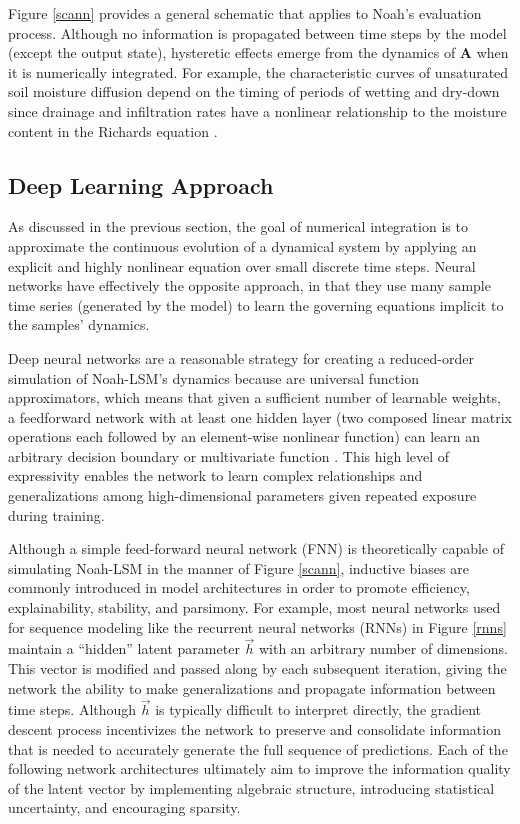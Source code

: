 \documentclass[11pt]{article}
\begin{document}
\begin{multicols}{2}

    Figure \ref{scann} provides a general schematic that applies to Noah's evaluation process. Although no information is propagated between time steps by the model (except the output state), hysteretic effects emerge from the dynamics of \textbf{A} when it is numerically integrated. For example, the characteristic curves of unsaturated soil moisture diffusion depend on the timing of periods of wetting and dry-down since drainage and infiltration rates have a nonlinear relationship to the moisture content in the Richards equation \cite{jaynes_comparison_1984}.

    \subsection{Deep Learning Approach}

    As discussed in the previous section, the goal of numerical integration is to approximate the continuous evolution of a dynamical system by applying an explicit and highly nonlinear equation over small discrete time steps. Neural networks have effectively the opposite approach, in that they use many sample time series (generated by the model) to learn the governing equations implicit to the samples' dynamics.

    Deep neural networks are a reasonable strategy for creating a reduced-order simulation of Noah-LSM's dynamics because are universal function approximators, which means that given a sufficient number of learnable weights, a feedforward network with at least one hidden layer (two composed linear matrix operations each followed by an element-wise nonlinear function) can learn an arbitrary decision boundary or multivariate function \cite{hornik_multilayer_1989}. This high level of expressivity enables the network to learn complex relationships and generalizations among high-dimensional parameters given repeated exposure during training.

    Although a simple feed-forward neural network (FNN) is theoretically capable of simulating Noah-LSM in the manner of Figure \ref{scann}, inductive biases are commonly introduced in model architectures in order to promote efficiency, explainability, stability, and parsimony. For example, most neural networks used for sequence modeling like the recurrent neural networks (RNNs) in Figure \ref{rnns} maintain a ``hidden'' latent parameter $\vec{h}$ with an arbitrary number of dimensions. This vector is modified and passed along by each subsequent iteration, giving the network the ability to make generalizations and propagate information between time steps. Although $\vec{h}$ is typically difficult to interpret directly, the gradient descent process incentivizes the network to preserve and consolidate information that is needed to accurately generate the full sequence of predictions. Each of the following network architectures ultimately aim to improve the information quality of the latent vector by implementing algebraic structure, introducing statistical uncertainty, and encouraging sparsity.


\end{multicols}
\end{document}
